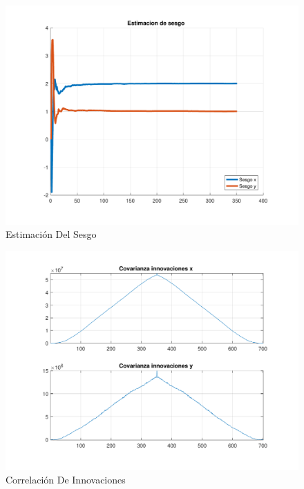 	\begin{figure}[H]
		\centering
		\includegraphics[width=1.0\textwidth,keepaspectratio]{Figuras/bias_ej4f.pdf}
		\caption{Estimación Del Sesgo}
		\label{fig:ej3f_bias}
	\end{figure}

	\begin{figure}[H]
		\centering
		\includegraphics[width=1.0\textwidth,keepaspectratio]{Figuras/covinn_ej4f.pdf}
		\caption{Correlación De Innovaciones}
		\label{fig:ej3f_cov}
	\end{figure}


